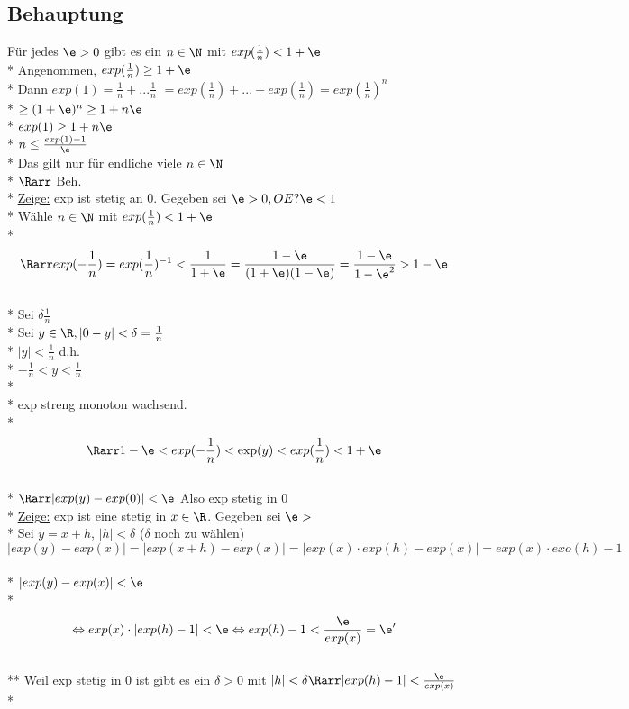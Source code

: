 \subsection*{Behauptung}
Für jedes $\e > 0$ gibt es ein $n \in \N$ mit $exp(\frac{1}{n}) < 1 + \e$\\*
Angenommen, $exp(\frac{1}{n}) \geq 1 + \e$\\*
Dann $exp(1) = \frac{1}{n} + ... \frac{1}{n}$ %
\phantom{Dann $exp(1) $} $= exp(\frac{1}{n}) + ... + exp(\frac{1}{n}) = exp(\frac{1}{n})^n$ \\*
\phantom{Dann $exp(1) $} $ \geq (1 + \e)^n \geq 1 + n \e $ %
\\*
$exp(1) \geq 1 + n \e$\\*
$n \leq \frac{exp(1) - 1}{\e}$\\*
Das gilt nur für endliche viele $n \in \N$\\*
$\Rarr$ Beh.\\*
\ul{Zeige:} exp ist stetig an 0. Gegeben sei $\e > 0, OE ? \e < 1$\\*
Wähle $n \in \N$ mit $exp(\frac{1}{n}) < 1 + \e$\\*
$$\Rarr exp(-\frac{1}{n}) = exp(\frac{1}{n})^{-1} < \frac{1}{1 + \e} = \frac{1 - \e}{(1+\e)(1-\e)} = \frac{1-\e}{1 - \e^2} > 1 - \e$$\\*
Sei $\delta \frac{1}{n}$\\*
Sei $y \in \R, |0 - y| < \delta = \frac{1}{n}$\\*
$|y| < \frac{1}{n}$ d.h.\\*
$-\frac{1}{n} < y < \frac{1}{n}$\\* \\*
exp streng monoton wachsend.\\*
$$\Rarr 1 - \e < exp(-\frac{1}{n}) < \exp(y) < exp(\frac{1}{n}) < 1 + \e$$\\*
$\Rarr |exp(y) - exp(0)| < \e$ Also exp stetig in 0\\*
\ul{Zeige:} exp ist eine stetig in $x \in \R$. Gegeben sei $\e > $\\*
Sei $y = x + h$, $|h| < \delta$ ($\delta$ noch zu wählen)
$$|exp(y) - exp(x)| = |exp(x + h) - exp(x)| = |exp(x) \cdot exp(h) - exp(x)| = exp(x) \cdot exo(h) -1$$\\*
$|exp(y) -exp(x) | < \e$\\*
$$\Leftrightarrow exp(x) \cdot |exp(h) - 1| < \e \Leftrightarrow exp(h) - 1 < \frac{\e}{exp(x)} = \e '$$\\**
Weil exp stetig in 0 ist gibt es ein $\delta > 0$ mit $|h| < \delta \Rarr |exp(h) -1| < \frac{\e}{exp(x)}$\\*
